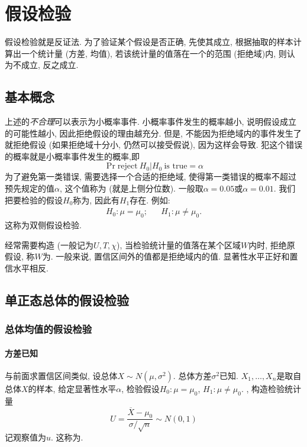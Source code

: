 \chapter{假设检验}
假设检验就是反证法. 为了验证某个假设是否正确, 先使其成立, 根据抽取的样本计算出一个统计量 (方差, 均值), 若该统计量的值落在一个的范围 (拒绝域)内, 则认为不成立, 反之成立.
\section{基本概念}
上述的\emph{不合理}可以表示为小概率事件. 小概率事件发生的概率越小, 说明假设成立的可能性越小, 因此拒绝假设的理由越充分. 但是, 不能因为拒绝域内的事件发生了就拒绝假设 (如果拒绝域十分小, 仍然可以接受假说), 因为这样会导致. 犯这个错误的概率就是小概率事件发生的概率,即
\[
    \Pr{\text{reject}\ H_0 | H_0\ \text{is true}} = \alpha
\]
为了避免第一类错误, 需要选择一个合适的拒绝域, 使得第一类错误的概率不超过预先规定的值$\alpha$, 这个值称为 (就是上侧分位数). 一般取$\alpha = 0.05$或$\alpha = 0.01$. 我们把要检验的假设$H_0$称为, 因此有$H_1$存在. 例如:
\begin{align*}
    H_0:\mu = \mu_0; &  & H_1:\mu \neq \mu_0.
\end{align*}
这称为双侧假设检验.

经常需要构造 (一般记为$U, T, \chi$), 当检验统计量的值落在某个区域$W$内时, 拒绝原假设, 称$W$为. 一般来说, 置信区间外的值都是拒绝域内的值. 显著性水平正好和置信水平相反.
\section{单正态总体的假设检验}
\subsection{总体均值的假设检验}
\subsubsection{方差已知}
与前面求置信区间类似, 设总体$X\sim N(\mu, \sigma^2)$. 总体方差$\sigma^2$已知. $X_1,\ldots,X_n$是取自总体$X$的样本, 给定显著性水平$\alpha$, 检验假设$H_0:\mu=\mu_0$, $H_1:\mu\neq\mu_0$. , 构造检验统计量
\begin{equation}
    U = \dfrac{\overline{X} - \mu_0}{\sigma/\sqrt{n}}\sim N(0,1)
\end{equation}
记观察值为$u$. 这称为.

